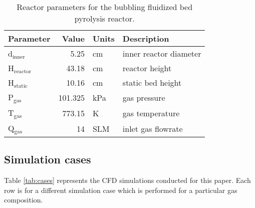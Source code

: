 \begin{table}[H]
    \centering
    \caption{Reactor parameters for the bubbling fluidized bed pyrolysis reactor.}
    \label{tab:params-reactor}
    \begin{tabular}{lrll}
        \toprule
        Parameter & Value & Units & Description \\
        \midrule
        d$_\textrm{inner}$    & 5.25     & cm   & inner reactor diameter  \\
        H$_\textrm{reactor}$  & 43.18    & cm   & reactor height          \\
        H$_\textrm{static}$   & 10.16    & cm   & static bed height       \\
        P$_\textrm{gas}$      & 101.325  & kPa  & gas pressure            \\
        T$_\textrm{gas}$      & 773.15   & K    & gas temperature         \\
        Q$_\textrm{gas}$      & 14       & SLM  & inlet gas flowrate      \\
        \bottomrule
    \end{tabular}
\end{table}

\subsection{Simulation cases}

Table \ref{tab:cases} represents the CFD simulations conducted for this paper. Each row is for a different simulation case which is performed for a particular gas composition.


